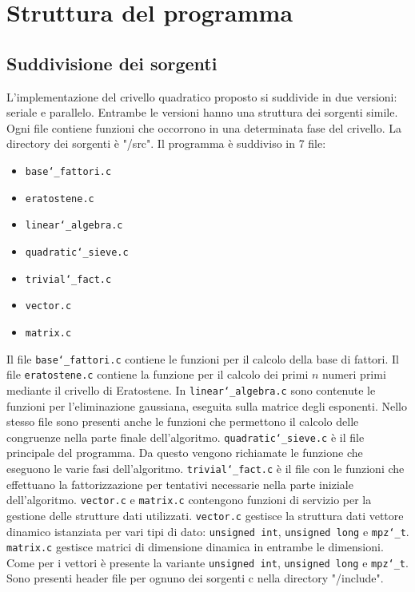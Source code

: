 \section{Struttura del programma}
\label{sec:struttura}
\subsection{Suddivisione dei sorgenti}
L'implementazione del crivello quadratico proposto si suddivide in due
versioni: seriale e parallelo.
Entrambe le versioni hanno una struttura dei sorgenti simile.
Ogni file contiene funzioni che occorrono in una determinata fase del
crivello. La directory dei sorgenti è "/src". Il programma è
suddiviso in 7 file:

\begin{itemize}
\item \texttt{base\char`_fattori.c}
\item \texttt{eratostene.c}
\item \texttt{linear\char`_algebra.c}
\item \texttt{quadratic\char`_sieve.c}
\item \texttt{trivial\char`_fact.c}
\item \texttt{vector.c}
\item \texttt{matrix.c}
\end{itemize}

Il file \texttt{base\char`_fattori.c} contiene le funzioni per il
calcolo della base di fattori. Il file \texttt{eratostene.c} contiene
la funzione per il calcolo dei primi $n$ numeri primi mediante il
crivello di Eratostene. In \texttt{linear\char`_algebra.c} sono
contenute  le funzioni per l'eliminazione gaussiana, eseguita sulla
matrice degli esponenti. Nello stesso file sono presenti anche le
funzioni che permettono il calcolo delle congruenze nella parte
finale dell'algoritmo. \texttt{quadratic\char`_sieve.c} è il file
principale del programma. Da questo vengono richiamate 
le funzione che eseguono le varie fasi
dell'algoritmo. \texttt{trivial\char`_fact.c} è il file con le
funzioni che effettuano la fattorizzazione per tentativi necessarie
nella parte iniziale dell'algoritmo. \texttt{vector.c} e
\texttt{matrix.c} contengono funzioni di servizio per la
gestione delle strutture dati utilizzati. \texttt{vector.c} gestisce
la struttura dati vettore dinamico istanziata per vari tipi di dato:
\texttt{unsigned int}, \texttt{unsigned long} e \texttt{mpz\char`_t}. 
\texttt{matrix.c} gestisce matrici di dimensione dinamica in entrambe le
dimensioni. Come per i vettori è presente la variante \texttt{unsigned
int}, \texttt{unsigned long} e \texttt{mpz\char`_t}.
Sono presenti header file per ognuno dei sorgenti c nella directory 
"/include".
